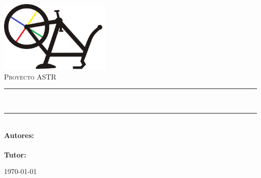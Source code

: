 \newcommand{\HRule}{\rule{\linewidth}{0.5mm}}

\begin{titlepage}
\begin{center}
	\includegraphics[width=0.4\textwidth]{images/logo}~
	\\[1cm]

	\textsc{Proyecto ASTR}

	\HRule \\[0.4cm]
	\textsc{\LARGE \Title}
	\HRule \\[0.4cm]

	\large \textbf{Autores:}\\
	\Authors
	\\[1cm]
	\large \textbf{Tutor:}\\
	\Tutor

	\vfill

	\begin{flushright}
		\large \today
	\end{flushright}

\end{center}
\end{titlepage}
